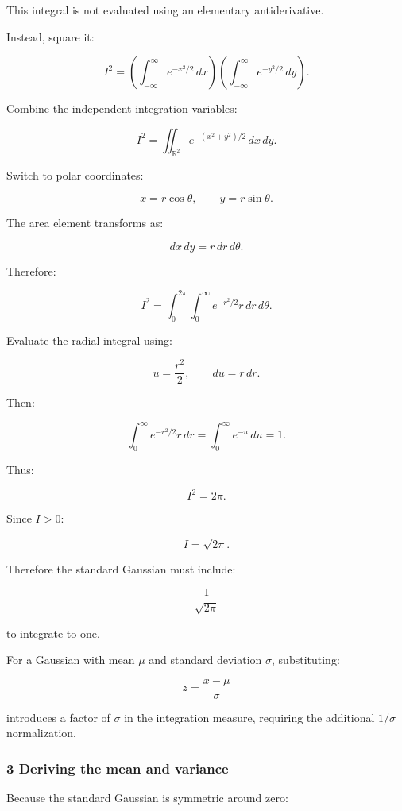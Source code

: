 This integral is not evaluated using an elementary antiderivative.

Instead, square it:

\[
 I^2= \left(\int_{-\infty}^{\infty}e^{-x^2/2}\,dx\right) \left(\int_{-\infty}^{\infty}e^{-y^2/2}\,dy\right).
\]

Combine the independent integration variables:

\[
 I^2= \iint_{\mathbb R^2} e^{-(x^2+y^2)/2}\,dx\,dy.
\]

Switch to polar coordinates:

\[
 x=r\cos\theta, \qquad y=r\sin\theta.
\]

The area element transforms as:

\[
 dx\,dy=r\,dr\,d\theta.
\]

Therefore:

\[
 I^2= \int_0^{2\pi}\int_0^\infty e^{-r^2/2}r\,dr\,d\theta.
\]

Evaluate the radial integral using:

\[
 u=\frac{r^2}{2}, \qquad du=r\,dr.
\]

Then:

\[
 \int_0^\infty e^{-r^2/2}r\,dr = \int_0^\infty e^{-u}\,du =1.
\]

Thus:

\[
 I^2=2\pi.
\]

Since \(I>0\):

\[
 \boxed{I=\sqrt{2\pi}}.
\]

Therefore the standard Gaussian must include:

\[
 \frac1{\sqrt{2\pi}}
\]

to integrate to one.

For a Gaussian with mean \(\mu\) and standard deviation \(\sigma\), substituting:

\[
 z=\frac{x-\mu}{\sigma}
\]

introduces a factor of \(\sigma\) in the integration measure, requiring the additional \(1/\sigma\) normalization.

\subsubsection{3 Deriving the mean and variance}\label{02-foundations-ii-ch023-deriving-the-mean-and-variance}

\hypertarget{02-foundations-ii-ch023-deriving-the-mean-and-variance}{}

Because the standard Gaussian is symmetric around zero:

